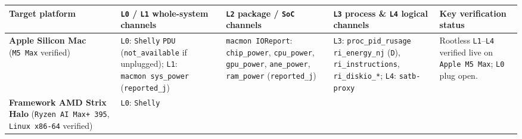 \documentclass[10pt,letterpaper]{article}
\begin{document}
{\footnotesize\setlength{\tabcolsep}{3.8pt}\renewcommand{\arraystretch}{1.15}
\begin{longtable}[]{@{}
  >{\raggedright\arraybackslash}p{}
  >{\raggedright\arraybackslash}p{}
  >{\raggedright\arraybackslash}p{}
  >{\raggedright\arraybackslash}p{}
  >{\raggedright\arraybackslash}p{}@{}}
\toprule\noalign{}
\begin{minipage}[b]{\linewidth}\raggedright
\textbf{Target platform}
\end{minipage} & \begin{minipage}[b]{\linewidth}\raggedright
\textbf{\texttt{L0} / \texttt{L1} whole-system channels}
\end{minipage} & \begin{minipage}[b]{\linewidth}\raggedright
\textbf{\texttt{L2} package / \texttt{SoC} channels}
\end{minipage} & \begin{minipage}[b]{\linewidth}\raggedright
\textbf{\texttt{L3} process \& \texttt{L4} logical channels}
\end{minipage} & \begin{minipage}[b]{\linewidth}\raggedright
\textbf{Key verification status}
\end{minipage} \\
\midrule\noalign{}
\endhead
\bottomrule\noalign{}
\endlastfoot
\textbf{Apple Silicon Mac} (\texttt{M5\ Max} verified) & \texttt{L0}:
\texttt{Shelly} \texttt{PDU} (\texttt{not\_\allowbreak{}available} if unplugged);
\texttt{L1}: \texttt{macmon\ sys\_\allowbreak{}power} (\texttt{reported\_\allowbreak{}j}) &
\texttt{macmon\ IOReport}: \texttt{chip\_\allowbreak{}power}, \texttt{cpu\_\allowbreak{}power},
\texttt{gpu\_\allowbreak{}power}, \texttt{ane\_\allowbreak{}power}, \texttt{ram\_\allowbreak{}power}
(\texttt{reported\_\allowbreak{}j}) & \texttt{L3}: \texttt{proc\_\allowbreak{}pid\_\allowbreak{}rusage}
\texttt{ri\_\allowbreak{}energy\_\allowbreak{}nj} (\texttt{D}), \texttt{ri\_\allowbreak{}instructions},
\texttt{ri\_\allowbreak{}diskio\_\allowbreak{}*}; \texttt{L4}: \texttt{satb-\allowbreak{}proxy} & Rootless
\texttt{L1}--\texttt{L4} verified live on \texttt{Apple\ M5\ Max};
\texttt{L0} plug open. \\
\textbf{Framework AMD Strix Halo} (\texttt{Ryzen\ AI\ Max+\ 395},
\texttt{Linux\ x86-\allowbreak{}64} verified) & \texttt{L0}: \texttt{Shelly}

\end{longtable}}
\end{document}
